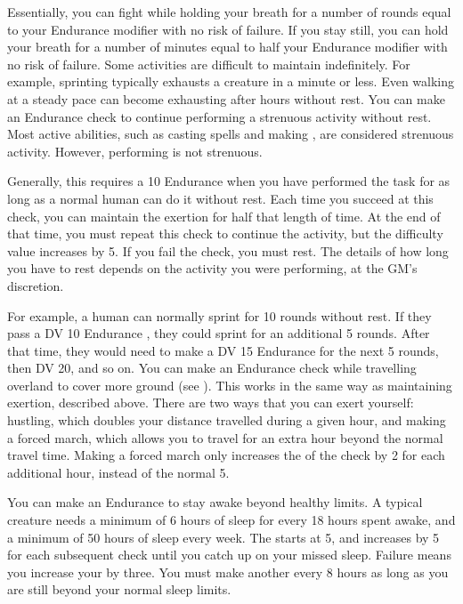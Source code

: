     Essentially, you can fight while holding your breath for a number of rounds equal to your Endurance modifier with no risk of failure.
    If you stay still, you can hold your breath for a number of minutes equal to half your Endurance modifier with no risk of failure.
    Some activities are difficult to maintain indefinitely.
    For example, sprinting typically exhausts a creature in a minute or less.
    Even walking at a steady pace can become exhausting after hours without rest.
    You can make an Endurance check to continue performing a strenuous activity without rest.
    Most active abilities, such as casting spells and making , are considered strenuous activity.
    However, performing  is not strenuous.

    Generally, this requires a  10 Endurance  when you have performed the task for as long as a normal human can do it without rest.
    Each time you succeed at this check, you can maintain the exertion for half that length of time.
    At the end of that time, you must repeat this check to continue the activity, but the difficulty value increases by 5.
    If you fail the check, you must rest.
    The details of how long you have to rest depends on the activity you were performing, at the GM's discretion.

    For example, a human can normally sprint for 10 rounds without rest.
    If they pass a DV 10 Endurance , they could sprint for an additional 5 rounds.
    After that time, they would need to make a DV 15 Endurance  for the next 5 rounds, then DV 20, and so on.
     You can make an Endurance check while travelling overland to cover more ground (see ).
    This works in the same way as maintaining exertion, described above.
    There are two ways that you can exert yourself: hustling, which doubles your distance travelled during a given hour, and making a forced march, which allows you to travel for an extra hour beyond the normal travel time.
    Making a forced march only increases the  of the check by 2 for each additional hour, instead of the normal 5.

     You can make an Endurance  to stay awake beyond healthy limits.
    A typical creature needs a minimum of 6 hours of sleep for every 18 hours spent awake, and a minimum of 50 hours of sleep every week.
    The  starts at 5, and increases by 5 for each subsequent check until you catch up on your missed sleep.
    Failure means you increase your  by three.
    You must make another  every 8 hours as long as you are still beyond your normal sleep limits.

